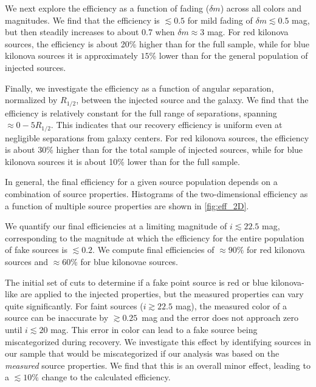 We next explore the efficiency as a function of fading ($\delta m$) across all colors and magnitudes. We find that the efficiency is $\lesssim 0.5$ for mild fading of $\delta m\lesssim 0.5$ mag, but then steadily increases to about 0.7 when $\delta m\approx 3$ mag. For red kilonova sources, the efficiency is about 20\% higher than for the full sample, while for blue kilonova sources it is approximately $15$\% lower than for the general population of injected sources.

Finally, we investigate the efficiency as a function of angular separation, normalized by $R_{1/2}$, between the injected source and the galaxy. We find that the efficiency is relatively constant for the full range of separations, spanning $\approx 0-5 R_{1/2}$. This indicates that our recovery efficiency is uniform even at negligible separations from galaxy centers. For red kilonova sources, the efficiency is about 30\% higher than for the total sample of injected sources, while for blue kilonova sources it is about 10\% lower than for the full sample.

In general, the final efficiency for a given source population depends on a combination of source properties. Histograms of the two-dimensional efficiency as a function of multiple source properties are shown in \autoref{fig:eff_2D}.

We quantify our final efficiencies at a limiting magnitude of $i \lesssim 22.5$ mag, corresponding to the magnitude at which the efficiency for the entire population of fake sources is $\lesssim0.2$. We compute final efficiencies of $\approx90\%$ for red kilonova sources and $\approx60\%$ for blue kilonovae sources.

The initial set of cuts to determine if a fake point source is red or blue kilonova-like are applied to the injected properties, but the measured properties can vary quite significantly. For faint sources ($i \gtrsim 22.5$ mag), the measured color of a source can be inaccurate by $\gtrsim 0.25$~mag and the error does not approach zero until $i  \lesssim 20$ mag. This error in color can lead to a fake source being miscategorized during recovery. We investigate this effect by identifying sources in our sample that would be miscategorized if our analysis was based on the {\it measured} source properties. We find that this is an overall minor effect, leading to a $\lesssim 10 \%$ change to the calculated efficiency.


